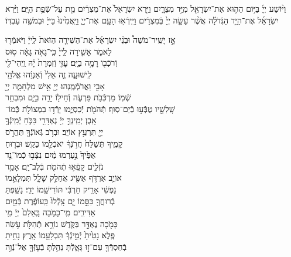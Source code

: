 \documentclass[twoside, openany, parskip=half, 11pt]{book}
\begin{document}
וַיּ֨וֹשַׁע
יְיָ֜ בַּיּ֥וֹם הַה֛וּא אֶת־יִשְׂרָאֵ֖ל מִיַּ֣ד מִצְרָ֑יִם וַיַּ֤רְא יִשְׂרָאֵל֙ אֶת־מִצְרַ֔יִם מֵ֖ת עַל־שְֿׂפַ֥ת הַיָּֽם׃
וַיַּ֨רְא יִשְׂרָאֵ֜ל אֶת־הַיָּ֣ד הַגְּֿדֹלָ֗ה אֲשֶׁ֨ר עָשָׂ֤ה יְיָ֙ בְּֿמִצְרַ֔יִם וַיִּֽירְֿא֥וּ הָעָ֖ם אֶת־יְיָ֑ וַיַּֽאֲמִ֙ינוּ֙ בַּייָ֔ וּבְמֹשֶׁ֖ה עַבְדּֽוֹ׃

אָ֣ז \hfill
יָשִֽׁיר־מֹשֶׁה֩ \hfill וּבְנֵ֨י \hfill יִשְׂרָאֵ֜ל \hfill אֶת־הַשִּׁירָ֤ה \hfill הַזֹּאת֙ \hfill לַֽייָ֔ \hfill וַיֹּאמְֿר֖וּ \\
לֵאמֹ֑ר \hfill אָשִׁ֤ירָה לַֽייָ֙ כִּֽי־גָאֹ֣ה גָּאָ֔ה \hfill ס֥וּס \\
וְֿרֹכְֿב֖וֹ רָמָ֥ה בַיָּֽם׃ \hfill עׇזִּ֤י וְֿזִמְרָת֙ יָ֔הּ וַֽיְהִי־לִ֖י \\
לִֽישׁוּעָ֑ה \hfill זֶ֤ה אֵלִי֙ וְֿאַנְוֵ֔הוּ \hfill אֱלֹהֵ֥י \\
אָבִ֖י וַאֲרֹמְֿמֶֽנְהוּ׃ \hfill יְיָ֖ אִ֣ישׁ מִלְחָמָ֑ה יְיָ֖ \\
שְֿׁמֽוֹ׃ \hfill מַרְכְּֿֿבֹ֥ת פַּרְעֹ֛ה וְֿחֵיל֖וֹ יָרָ֣ה בַיָּ֑ם \hfill וּמִבְחַ֥ר\\
שָֽׁלִשָׁ֖יו טֻבְּֿע֥וּ בְֿיַם־סֽוּף׃ \hfill תְּֿהֹמֹ֖ת יְֿכַסְיֻ֑מוּ יָרְֿד֥וּ בִמְצוֹלֹ֖ת כְּֿמוֹ־\\
אָֽבֶן׃ \hfill יְמִֽינְךָ֣ יְיָ֔ נֶאְדָּרִ֖י בַּכֹּ֑חַ \hfill יְֿמִֽינְֿךָ֥ \\
יְיָ֖ תִּרְעַ֥ץ אוֹיֵֽב׃ \hfill וּבְרֹ֥ב גְּֿאוֹנְֿךָ֖ תַּהֲרֹ֣ס \\
קָמֶ֑יךָ \hfill תְּֿשַׁלַּח֙ חֲרֹ֣נְֿךָ֔ יֹאכְֿלֵ֖מוֹ כַּקַּֽשׁ׃ \hfill וּבְר֤וּחַ \\
אַפֶּ֙יךָ֙ נֶ֣עֶרְמוּ מַ֔יִם \hfill נִצְּֿב֥וּ כְֿמוֹ־נֵ֖ד \\
נֹזְֿלִ֑ים \hfill קָֽפְֿא֥וּ תְֿהֹמֹ֖ת בְּֿלֶב־יָֽם׃ \hfill אָמַ֥ר \\
אוֹיֵ֛ב אֶרְדֹּ֥ף אַשִּׂ֖יג \hfill אֲחַלֵּ֣ק שָׁלָ֑ל תִּמְלָאֵ֣מוֹ \\
נַפְשִׁ֔י \hfill אָרִ֣יק חַרְבִּ֔י תּוֹרִישֵׁ֖מוֹ יָדִֽי׃ \hfill נָשַׁ֥פְתָּ \\
בְֿרוּחֲךָ֖ כִּסָּ֣מוֹ יָ֑ם \hfill צָֽלְֿלוּ֙ כַּֽעוֹפֶ֔רֶת בְּֿמַ֖יִם \\
אַדִּירִֽים׃ \hfill מִֽי־כָמֹ֤כָה בָּֽאֵלִם֙ יְיָ֔ \hfill מִ֥י \\
כָּמֹ֖כָה נֶאְדָּ֣ר בַּקֹּ֑דֶשׁ \hfill נוֹרָ֥א תְֿהִלֹּ֖ת עֹ֥שֵׂה \\
פֶֽלֶא׃ \hfill נָטִ֙יתָ֙ יְֿמִ֣ינְֿךָ֔ תִּבְלָעֵ֖מוֹ אָֽרֶץ׃ \hfill נָחִ֥יתָ \\
בְֿחַסְדְּֿֿךָ֖ עַם־ז֣וּ גָּאָ֑לְֿתָּ \hfill נֵהַ֥לְתָּ בְֿעׇזְּֿךָ֖ אֶל־נְֿוֵ֥ה \\
\end{document}
